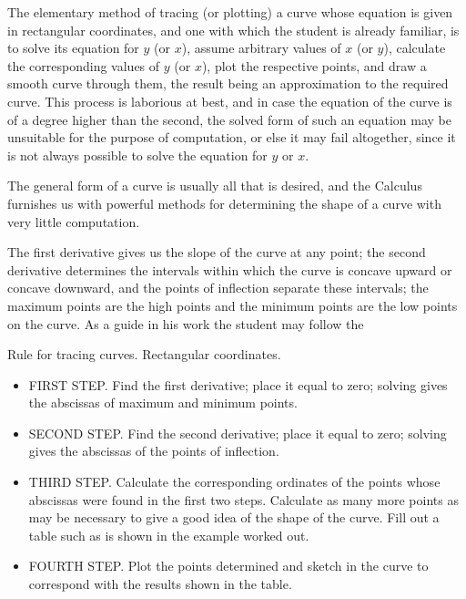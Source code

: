 The elementary method of tracing (or plotting) a curve whose 
equation is given in rectangular coordinates, and one with which 
the student is already familiar, is to solve its equation for $y$ (or $x$), 
assume arbitrary values of $x$ (or $y$), calculate the corresponding 
values of $y$ (or $x$), plot the respective points, and draw 
a smooth curve through them, the result being an approximation 
to the required curve. This process is laborious at best, and 
in case the equation of the curve is of a degree higher than 
the second, the solved form of such an equation may be unsuitable 
for the purpose of computation, or else it may fail altogether, 
since it is not always possible to solve the equation for $y$ or $x$.

The general form of a curve is usually all that is desired, and the 
Calculus furnishes us with powerful methods for determining 
the shape of a curve with very little computation.

The first derivative gives us the slope of the curve at any 
point; the second derivative determines the intervals within 
which the curve is concave upward or concave downward, and the 
points of inflection separate these intervals; the maximum points 
are the high points and the minimum points are the low points 
on the curve. As a guide in his work the student may follow the

Rule for tracing curves. Rectangular coordinates.

\begin{itemize}
\item
FIRST STEP. 
Find the first derivative; place it equal to zero; solving gives 
the abscissas of maximum and minimum points.

\item
SECOND STEP. Find the second derivative; place it equal to zero; 
solving gives the abscissas of the points of inflection.

\item
THIRD STEP. Calculate the corresponding ordinates of the 
points whose abscissas were found in the first two steps. 
Calculate as many more points as may be necessary to give a 
good idea of the shape of the curve. Fill out a table such as 
is shown in the example worked out.

\item
FOURTH STEP. Plot the points determined and sketch in the curve 
to correspond with the results shown in the table.
\end{itemize}

